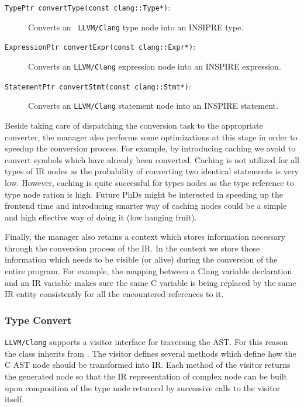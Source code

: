 \begin{description}
\item [{\tt TypePtr convertType(const clang::Type*)}:] Converts an {\tt
LLVM/Clang} type node into an INSIPRE type.

\item [{\tt ExpressionPtr convertExpr(const clang::Expr*)}:] Converts an
{\tt LLVM/Clang} expression node into an INSPIRE expression. 

\item [{\tt StatementPtr convertStmt(const clang::Stmt*)}:] Converts an
{\tt LLVM/Clang} statement node into an INSPIRE statement.

\end{description}

Beside taking care of dispatching the conversion task to the appropriate
converter, the manager also performs some optimizations at this stage in order
to speedup the conversion process. For example, by introducing caching we avoid
to convert symbols which have already been converted. Caching is not utilized
for all types of IR nodes as the probability of converting two identical
statements is very low. However, caching is quite successful for types nodes as
the type reference to type node ration is high. Future PhDs might be interested
in speeding up the frontend time and introducing smarter way of caching nodes
could be a simple and high effective way of doing it (low hanging fruit).

Finally, the manager also retains a context which stores information necessary
through the conversion process of the IR. In the context we store those
information which needs to be visible (or alive) during the conversion of the
entire program. For example, the mapping between a Clang variable declaration
and an IR variable makes sure the same C variable is being replaced by the same IR
entity consistently for all the encountered references to it. 

\subsubsection{Type Convert}
{\tt LLVM/Clang} supports a visitor interface for traversing the AST. For this
reason the class  inherits from
. The visitor defines several methods which define how
the C AST node should be transformed into IR. Each method of the visitor returns
the generated node so that the IR representation of complex node can be built
upon composition of the type node returned by successive calls to the visitor
itself. 

